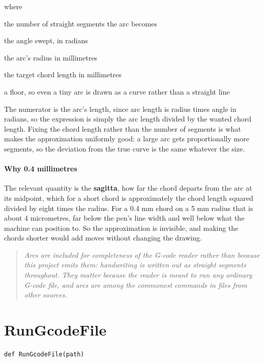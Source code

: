 \noindent where
\begin{description}[leftmargin=2.4em,style=nextline,font=\normalfont\ttfamily]\setlength\itemsep{1pt}
  \item[{$n$}] \normalfont the number of straight segments the arc becomes
  \item[{$|\Delta\theta|$}] \normalfont the angle swept, in radians
  \item[{$r$}] \normalfont the arc's radius in millimetres
  \item[{$0.4$}] \normalfont the target chord length in millimetres
  \item[{$\max(4,\cdot)$}] \normalfont a floor, so even a tiny arc is drawn as a curve rather than a straight line
\end{description}
The numerator is the arc's length, since arc length is radius times angle in radians, so the expression is simply the arc length divided by the wanted chord length. Fixing the chord length rather than the number of segments is what makes the approximation uniformly good: a large arc gets proportionally more segments, so the deviation from the true curve is the same whatever the size.


\paragraph{Why 0.4 millimetres}
The relevant quantity is the \textbf{sagitta}, how far the chord departs from the arc at its midpoint, which for a short chord is approximately the chord length squared divided by eight times the radius. For a 0.4 mm chord on a 5 mm radius that is about 4 micrometres, far below the pen's line width and well below what the machine can position to. So the approximation is invisible, and making the chords shorter would add moves without changing the drawing.


\begin{quote}\small\itshape Arcs are included for completeness of the G-code reader rather than because this project emits them: handwriting is written out as straight segments throughout. They matter because the reader is meant to run any ordinary G-code file, and arcs are among the commonest commands in files from other sources.\end{quote}

\section{RunGcodeFile}
\begin{lstlisting}[style=sig]
def RunGcodeFile(path)
\end{lstlisting}

